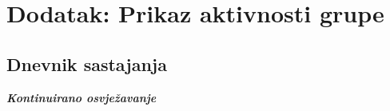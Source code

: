 \chapter*{Dodatak: Prikaz aktivnosti grupe}

\section*{Dnevnik sastajanja}

\textbf{\textit{Kontinuirano osvježavanje}}\\

\begin{comment}
\textit{U ovom dijelu potrebno je redovito osvježavati dnevnik sastajanja prema predlošku.}
\end{comment}

